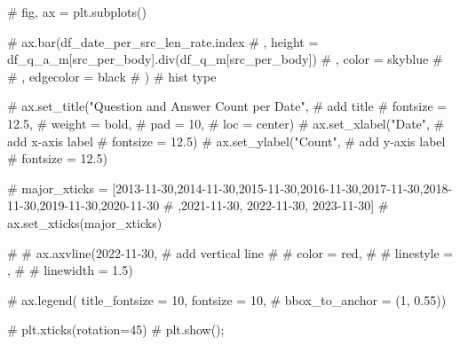 \documentclass[
  letterpaper,
  DIV=11,
  numbers=noendperiod]{scrartcl}
\newenvironment{Shaded}{\begin{snugshade}}{\end{snugshade}}
\newcommand{\CommentTok}[1]{\textcolor[rgb]{0.37,0.37,0.37}{#1}}
\begin{document}
\begin{Shaded}
\begin{Highlighting}[]
\CommentTok{\# fig, ax = plt.subplots()}

\CommentTok{\# ax.bar(df\_date\_per\_src\_len\_rate.index}
\CommentTok{\#     ,  height = df\_q\_a\_m[\textquotesingle{}src\_per\_body\textquotesingle{}].div(df\_q\_m[\textquotesingle{}src\_per\_body\textquotesingle{}])}
\CommentTok{\#     ,  color = \textquotesingle{}skyblue\textquotesingle{}}
\CommentTok{\#     \# ,  edgecolor = \textquotesingle{}black\textquotesingle{}}
\CommentTok{\#       ) \# hist type}

\CommentTok{\# ax.set\_title("Question and Answer Count per Date", \# add title}
\CommentTok{\#              fontsize = 12.5,}
\CommentTok{\#              weight = \textquotesingle{}bold\textquotesingle{},}
\CommentTok{\#              pad = 10,}
\CommentTok{\#              loc = \textquotesingle{}center\textquotesingle{})}
\CommentTok{\# ax.set\_xlabel("Date", \# add x{-}axis label}
\CommentTok{\#               fontsize = 12.5)}
\CommentTok{\# ax.set\_ylabel("Count", \# add y{-}axis label}
\CommentTok{\#               fontsize = 12.5)}

\CommentTok{\# major\_xticks = [\textquotesingle{}2013{-}11{-}30\textquotesingle{},\textquotesingle{}2014{-}11{-}30\textquotesingle{},\textquotesingle{}2015{-}11{-}30\textquotesingle{},\textquotesingle{}2016{-}11{-}30\textquotesingle{},\textquotesingle{}2017{-}11{-}30\textquotesingle{},\textquotesingle{}2018{-}11{-}30\textquotesingle{},\textquotesingle{}2019{-}11{-}30\textquotesingle{},\textquotesingle{}2020{-}11{-}30\textquotesingle{}}
\CommentTok{\#                 ,\textquotesingle{}2021{-}11{-}30\textquotesingle{}, \textquotesingle{}2022{-}11{-}30\textquotesingle{}, \textquotesingle{}2023{-}11{-}30\textquotesingle{}]}
\CommentTok{\# ax.set\_xticks(major\_xticks)}

\CommentTok{\# \# ax.axvline(\textquotesingle{}2022{-}11{-}30\textquotesingle{}, \# add vertical line}
\CommentTok{\# \#            color = \textquotesingle{}red\textquotesingle{},}
\CommentTok{\# \#            linestyle = \textquotesingle{}{-}{-}\textquotesingle{},}
\CommentTok{\# \#            linewidth = 1.5)}


\CommentTok{\# ax.legend( title\_fontsize = 10, fontsize = 10,}
\CommentTok{\#           bbox\_to\_anchor = (1, 0.55))}

\CommentTok{\# plt.xticks(rotation=45)}
\CommentTok{\# plt.show();}
\end{Highlighting}
\end{Shaded}
\end{document}
